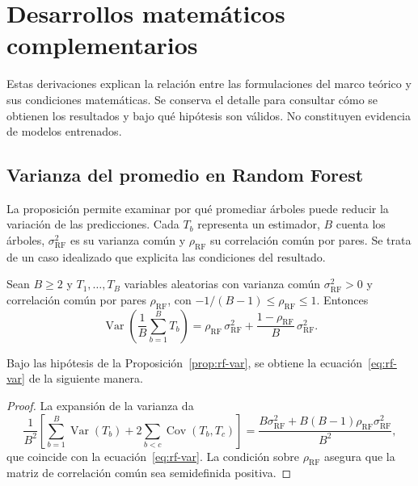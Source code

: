 \FloatBarrier
\section{Desarrollos matemáticos complementarios}\label{editorial:matematica}
Estas derivaciones explican la relación entre las formulaciones del marco teórico y sus condiciones matemáticas. Se conserva el detalle para consultar cómo se obtienen los resultados y bajo qué hipótesis son válidos. No constituyen evidencia de modelos entrenados.

\subsection{Varianza del promedio en Random Forest}\label{editorial:rf}
La proposición permite examinar por qué promediar árboles puede reducir la variación de las predicciones. Cada $T_b$ representa un estimador, $B$ cuenta los árboles, $\sigma_{\mathrm{RF}}^2$ es su varianza común y $\rho_{\mathrm{RF}}$ su correlación común por pares. Se trata de un caso idealizado que explicita las condiciones del resultado.
\begin{proposicion}\label{prop:rf-var}
Sean $B\geq2$ y $T_{1},\dots,T_{B}$ variables aleatorias con varianza común $\sigma_{\mathrm{RF}}^{2}>0$ y correlación común por pares $\rho_{\mathrm{RF}}$, con $-1/(B-1)\leq\rho_{\mathrm{RF}}\leq1$. Entonces
\begin{equation}\label{eq:rf-var}
\operatorname{Var}\!\left(\frac{1}{B}\sum_{b=1}^{B}T_{b}\right)
=\rho_{\mathrm{RF}}\,\sigma_{\mathrm{RF}}^{2}+\frac{1-\rho_{\mathrm{RF}}}{B}\,\sigma_{\mathrm{RF}}^{2}.
\end{equation}
\end{proposicion}
Bajo las hipótesis de la Proposición~\ref{prop:rf-var}, se obtiene la ecuación~\eqref{eq:rf-var} de la siguiente manera.
\begin{proof}
La expansión de la varianza da
\[
\frac{1}{B^2}\left[\sum_{b=1}^B\operatorname{Var}(T_b)+2\sum_{b<c}\operatorname{Cov}(T_b,T_c)\right]
=\frac{B\sigma_{\mathrm{RF}}^2+B(B-1)\rho_{\mathrm{RF}}\sigma_{\mathrm{RF}}^2}{B^2},
\]
que coincide con la ecuación~\eqref{eq:rf-var}. La condición sobre $\rho_{\mathrm{RF}}$ asegura que la matriz de correlación común sea semidefinida positiva.
\end{proof}
